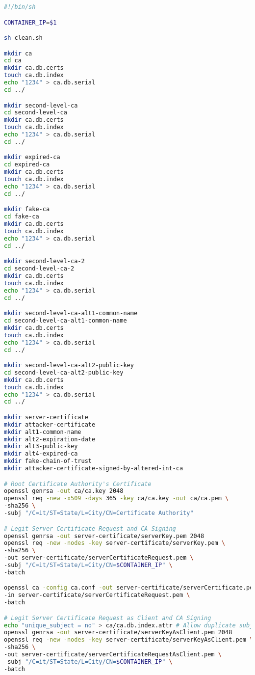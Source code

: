 \documentclass[binding=0.6cm,noexaminfo]{sapthesis}
\begin{document}
\begin{lstlisting}[language=Bash]
#!/bin/sh

CONTAINER_IP=$1

sh clean.sh

mkdir ca
cd ca
mkdir ca.db.certs
touch ca.db.index
echo "1234" > ca.db.serial
cd ../

mkdir second-level-ca
cd second-level-ca
mkdir ca.db.certs
touch ca.db.index
echo "1234" > ca.db.serial
cd ../

mkdir expired-ca
cd expired-ca
mkdir ca.db.certs
touch ca.db.index
echo "1234" > ca.db.serial
cd ../

mkdir fake-ca
cd fake-ca
mkdir ca.db.certs
touch ca.db.index
echo "1234" > ca.db.serial
cd ../

mkdir second-level-ca-2
cd second-level-ca-2
mkdir ca.db.certs
touch ca.db.index
echo "1234" > ca.db.serial
cd ../

mkdir second-level-ca-alt1-common-name
cd second-level-ca-alt1-common-name
mkdir ca.db.certs
touch ca.db.index
echo "1234" > ca.db.serial
cd ../

mkdir second-level-ca-alt2-public-key
cd second-level-ca-alt2-public-key
mkdir ca.db.certs
touch ca.db.index
echo "1234" > ca.db.serial
cd ../

mkdir server-certificate
mkdir attacker-certificate
mkdir alt1-common-name
mkdir alt2-expiration-date
mkdir alt3-public-key
mkdir alt4-expired-ca
mkdir fake-chain-of-trust
mkdir attacker-certificate-signed-by-altered-int-ca

# Root Certificate Authority's Certificate
openssl genrsa -out ca/ca.key 2048
openssl req -new -x509 -days 365 -key ca/ca.key -out ca/ca.pem \
-sha256 \
-subj "/C=it/ST=State/L=City/CN=Certificate Authority"

# Legit Server Certificate Request and CA Signing
openssl genrsa -out server-certificate/serverKey.pem 2048
openssl req -new -nodes -key server-certificate/serverKey.pem \
-sha256 \
-out server-certificate/serverCertificateRequest.pem \
-subj "/C=it/ST=State/L=City/CN=$CONTAINER_IP" \
-batch

openssl ca -config ca.conf -out server-certificate/serverCertificate.pem \
-in server-certificate/serverCertificateRequest.pem \
-batch

# Legit Server Certificate Request as Client and CA Signing
echo "unique_subject = no" > ca/ca.db.index.attr # Allow duplicate subjects to be signed by CA. In this case, the same subject wants to have a general SSL certificate and one for client authentication only.
openssl genrsa -out server-certificate/serverKeyAsClient.pem 2048
openssl req -new -nodes -key server-certificate/serverKeyAsClient.pem \
-sha256 \
-out server-certificate/serverCertificateRequestAsClient.pem \
-subj "/C=it/ST=State/L=City/CN=$CONTAINER_IP" \
-batch


\end{lstlisting}
\end{document}
